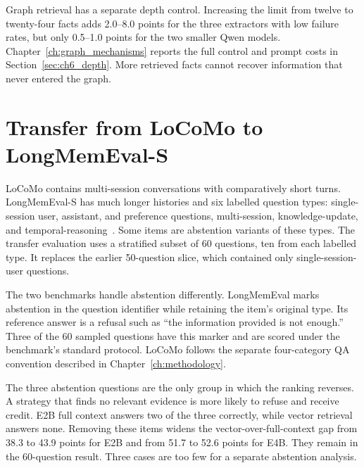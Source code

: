 Graph retrieval has a separate depth control. Increasing the limit from twelve to
twenty-four facts adds 2.0--8.0 points for the three extractors with low failure rates,
but only 0.5--1.0 points for the two smaller Qwen models. Chapter~\ref{ch:graph_mechanisms}
reports the full control and prompt costs in Section~\ref{sec:ch6_depth}. More retrieved
facts cannot recover information that never entered the graph.

\section{Transfer from LoCoMo to LongMemEval-S}
\label{sec:ch4_lme}

LoCoMo contains multi-session conversations with comparatively short turns. LongMemEval-S has much
longer histories and six labelled question types: single-session user, assistant, and preference
questions, multi-session, knowledge-update, and temporal-reasoning~\citep{longmemeval}. Some items
are abstention variants of these types. The transfer evaluation uses a stratified subset of 60
questions, ten from each labelled type. It replaces the earlier 50-question slice, which contained
only single-session-user questions.

The two benchmarks handle abstention differently. LongMemEval marks abstention in the question
identifier while retaining the item's original type. Its reference answer is a refusal such as
``the information provided is not enough.'' Three of the 60 sampled questions have this marker and
are scored under the benchmark's standard protocol. LoCoMo follows the separate four-category QA
convention described in Chapter~\ref{ch:methodology}.

The three abstention questions are the only group in which the ranking reverses. A strategy that
finds no relevant evidence is more likely to refuse and receive credit. E2B full context answers two
of the three correctly, while vector retrieval answers none. Removing these items widens the
vector-over-full-context gap from 38.3 to 43.9 points for E2B and from 51.7 to 52.6 points for E4B.
They remain in the 60-question result. Three cases are too few for a separate
abstention analysis.

